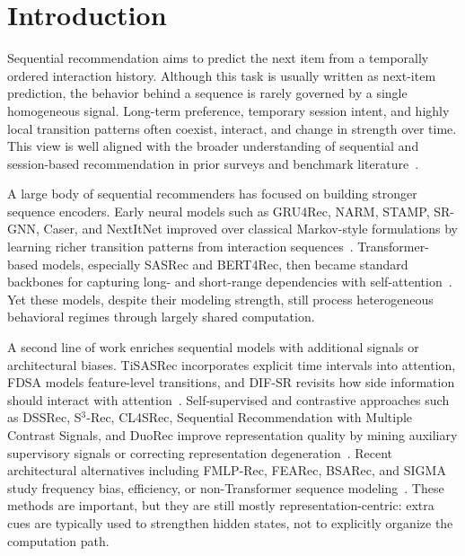 \documentclass[sigconf,anonymous,review]{acmart}
\begin{document}


\maketitle


\section{Introduction}
Sequential recommendation aims to predict the next item from a temporally ordered interaction history. Although this task is usually written as next-item prediction, the behavior behind a sequence is rarely governed by a single homogeneous signal. Long-term preference, temporary session intent, and highly local transition patterns often coexist, interact, and change in strength over time. This view is well aligned with the broader understanding of sequential and session-based recommendation in prior surveys and benchmark literature~\cite{wang2019seqsurvey,wang2021sessionsurvey}.

A large body of sequential recommenders has focused on building stronger sequence encoders. Early neural models such as GRU4Rec, NARM, STAMP, SR-GNN, Caser, and NextItNet improved over classical Markov-style formulations by learning richer transition patterns from interaction sequences~\cite{hidasi2016gru4rec,li2017narm,liu2018stamp,wu2019srgnn,tang2018caser,yuan2019nextitnet}. Transformer-based models, especially SASRec and BERT4Rec, then became standard backbones for capturing long- and short-range dependencies with self-attention~\cite{kang2018sasrec,sun2019bert4rec}. Yet these models, despite their modeling strength, still process heterogeneous behavioral regimes through largely shared computation.

A second line of work enriches sequential models with additional signals or architectural biases. TiSASRec incorporates explicit time intervals into attention, FDSA models feature-level transitions, and DIF-SR revisits how side information should interact with attention~\cite{li2020tisasrec,zhang2019fdsa,xie2022difsr}. Self-supervised and contrastive approaches such as DSSRec, S$^3$-Rec, CL4SRec, Sequential Recommendation with Multiple Contrast Signals, and DuoRec improve representation quality by mining auxiliary supervisory signals or correcting representation degeneration~\cite{ma2020dssrec,zhou2020s3rec,xie2020cl4srec,wang2023multiplecontrast,qiu2022duorec}. Recent architectural alternatives including FMLP-Rec, FEARec, BSARec, and SIGMA study frequency bias, efficiency, or non-Transformer sequence modeling~\cite{zhou2022fmlprec,du2023fearec,shin2024bsarec,liu2025sigma}. These methods are important, but they are still mostly representation-centric: extra cues are typically used to strengthen hidden states, not to explicitly organize the computation path.
\end{document}
